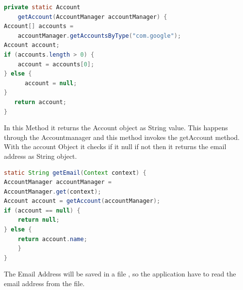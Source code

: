 \begin{lstlisting}[language=java, caption= Accounts]
private static Account 
	getAccount(AccountManager accountManager) {
Account[] accounts = 
	accountManager.getAccountsByType("com.google");
Account account;
if (accounts.length > 0) {
	account = accounts[0];     
} else {
      account = null;
}
   return account;
}

\end{lstlisting}

In this  Method it returns the Account object as String value. This happens through the Accountmanager and this method invokes the getAccount method. With the account Object it checks if it null if not then it returns the email address as String object.


\begin{lstlisting}[language=java, caption= Email]
static String getEmail(Context context) {
AccountManager accountManager = 
AccountManager.get(context); 
Account account = getAccount(accountManager);
if (account == null) {
	return null;
} else {
    return account.name;
	}
}
\end{lstlisting}
The Email Address will be saved in a file , so the application  have to read the email address from the file. 